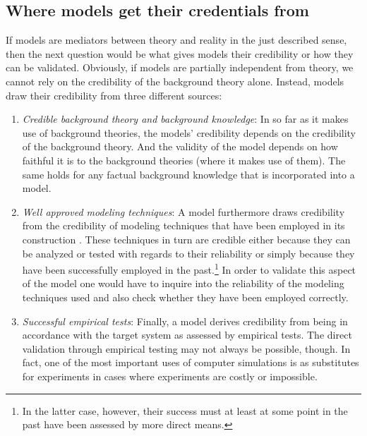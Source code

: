 \documentclass[onecollarge]{STJour}
\numberwithin{equation}{section}
\begin{document}
\subsection{Where models get their credentials from}

If models are mediators between theory and reality in the just described
sense, then the next question would be what gives models their
credibility or how they can be validated. Obviously, if models are
partially independent from theory, we cannot rely on the credibility of
the background theory alone. Instead, models draw their credibility
from three different sources: 

\begin{enumerate}

\item {\em Credible background theory and background knowledge}: In so
far as it makes use of background theories, the models' credibility
depends on the credibility of the background theory. And the validity of
the model depends on how faithful it is to the background theories
(where it makes use of them). The same holds for any factual
background knowledge that is incorporated into a model.

\item {\em Well approved modeling techniques}:\label{techniques} A model
furthermore draws credibility from the credibility of modeling techniques
that have been employed in its construction \citep[]{winsberg:2006}.
These techniques in turn are credible either because they can be analyzed
or tested with regards to their reliability or simply because they have
been successfully employed in the past.\footnote{In the latter case,
however, their success must at least at some point in the past have been
assessed by more direct means.} In order to validate this aspect of the
model one would have to inquire into the reliability of the modeling
techniques used and also check whether they have been employed
correctly.

\item {\em Successful empirical tests}: Finally, a model derives
credibility from being in accordance with the target system as assessed
by empirical tests. The direct validation through empirical testing may
not always be possible, though. In fact, one of the most
important uses of computer simulations is as substitutes for
experiments in cases where experiments are costly or impossible.

\end{enumerate} 
\end{document}
